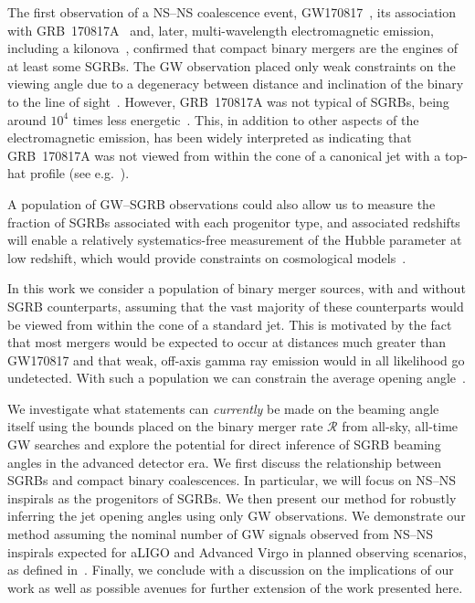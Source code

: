 \documentclass[twocolumn,nofootinbib]{revtex4-1}
\newcommand{\cbcrate}{{{\mathcal R}}}
\newcommand{\BNS}{\ac{NS}--\ac{NS}\xspace}
\newcommand{\JOINT}{\ac{GW}--\ac{SGRB}\xspace}
\begin{document}
The first observation of a \BNS coalescence event,
GW170817~\cite{TheLIGOScientific:2017qsa}, its association with
GRB~170817A~\cite{Monitor:2017mdv,Goldstein:2017mmi,Savchenko:2017ffs}
and, later, multi-wavelength electromagnetic emission, including a
kilonova~\cite{2017ApJ...848L..12A}, confirmed that compact binary mergers are
the engines of at least some \acp{SGRB}. The \ac{GW} observation placed only
weak constraints on the viewing angle due to a degeneracy between distance and
inclination of the binary to the line of sight~\cite{TheLIGOScientific:2017qsa}.
However, GRB~170817A was not typical of \acp{SGRB}, being around $10^{4}$ times
less energetic~\cite{Goldstein:2017mmi}. This, in addition to other aspects of
the electromagnetic emission, has been widely interpreted as indicating that
GRB~170817A was not viewed from within the cone of a canonical jet with a
top-hat profile (see
e.g.~\cite{Fong:2017ekk,Kasliwal:2017ngb,Gottlieb:2017pju,Haggard:2017qne}).

A population of \JOINT observations could also allow us to measure the fraction
of \acp{SGRB} associated with each progenitor type, and associated redshifts
will enable a relatively systematics-free measurement of the Hubble parameter
at low redshift, which would provide constraints on cosmological
models~\cite{Schutz:1986gp,Nissanke:2009kt,Chen:2012qh,Abbott:2017xzu}.

In this work we consider a population of binary merger sources, with and without
\ac{SGRB} counterparts, assuming that the vast majority of these counterparts
would be viewed from within the cone of a standard jet. This is motivated by the
fact that most mergers would be expected to occur at distances much greater than
GW170817 and that weak, off-axis gamma ray emission would in all likelihood go
undetected. With such a population we can constrain the average opening
angle~\cite{Chen:2012qh,Clark:2014jpa,Abbott:2016ymx}.

We investigate what statements can \emph{currently} be made on the beaming angle
itself using the bounds placed on the binary merger rate $\cbcrate$ from
all-sky, all-time \ac{GW} searches and explore the potential for direct
inference of \ac{SGRB} beaming angles in the advanced detector era.
We first discuss the relationship between \acp{SGRB} and compact binary
coalescences. In particular, we will focus on \BNS inspirals as the progenitors
of \acp{SGRB}. We then present our method for robustly inferring the jet opening
angles using only \ac{GW} observations. We demonstrate our method assuming the
nominal number of \ac{GW} signals observed from \BNS inspirals expected for
\ac{aLIGO} and Advanced Virgo in planned observing scenarios, as defined
in~\cite{Aasi:2013wya}. Finally, we conclude with a discussion on the
implications of our work as well as possible avenues for further extension of
the work presented here.
\end{document}
